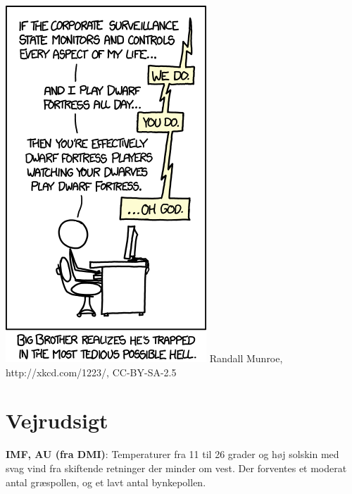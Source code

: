 \begin{minipage}[b]{0.95\linewidth}
\begin{minipage}[t]{0.47\textwidth}
\vspace{1mm}
\includegraphics[width=\linewidth]{dwarf_fortress.png}
\tiny Randall Munroe, http://xkcd.com/1223/, CC-BY-SA-2.5

\end{minipage}%
\hfill\begin{minipage}[t]{0.47\textwidth}
\vspace{2mm}
\section*{Vejrudsigt}
\textbf{IMF, AU (fra DMI)}: Temperaturer fra 11 til 26 grader og høj solskin med svag vind fra skiftende retninger der minder om vest. Der forventes et moderat antal græspollen, og et lavt antal bynkepollen.


\end{minipage}
\end{minipage}

